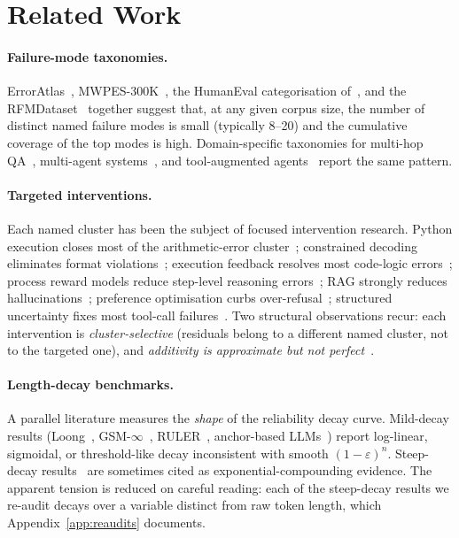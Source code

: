 \documentclass{article}
\theoremstyle{taeplain}
\theoremstyle{taedefn}
\begin{document}
\section{Related Work}
\label{sec:related}

\paragraph{Failure-mode taxonomies.}
ErrorAtlas~\citep{ashurytahan2026erroratlas}, MWPES-300K~\citep{sun2025mwpes}, the HumanEval categorisation of~\citet{wen2024fixing}, and the RFMDataset~\citep{guo2025rfmdataset} together suggest that, at any given corpus size, the number of distinct named failure modes is small (typically 8--20) and the cumulative coverage of the top modes is high. Domain-specific taxonomies for multi-hop QA~\citep{zhang2026weakestlink}, multi-agent systems~\citep{cemri2025mast}, and tool-augmented agents~\citep{yao2024taubench} report the same pattern.

\paragraph{Targeted interventions.}
Each named cluster has been the subject of focused intervention research. Python execution closes most of the arithmetic-error cluster~\citep{gao2022pal,chen2022pot,gou2024tora}; constrained decoding eliminates format violations~\citep{suresh2025dingo,wang2025slot,dong2024xgrammar}; execution feedback resolves most code-logic errors~\citep{shinn2023reflexion,huang2023agentcoder}; process reward models reduce step-level reasoning errors~\citep{wangp2024mathshepherd,lightman2024verify}; RAG strongly reduces hallucinations~\citep{wood2024acurai}; preference optimisation curbs over-refusal~\citep{karaman2024porover}; structured uncertainty fixes most tool-call failures~\citep{suri2025clarification}. Two structural observations recur: each intervention is \emph{cluster-selective} (residuals belong to a different named cluster, not to the targeted one), and \emph{additivity is approximate but not perfect}~\citep{patel2026sixsigma,le2026interaction}.

\paragraph{Length-decay benchmarks.}
A parallel literature measures the \emph{shape} of the reliability decay curve. Mild-decay results (Loong~\citep{wangm2024loong}, GSM-$\infty$~\citep{zhou2025gsminfinite}, RULER~\citep{hsieh2024ruler}, anchor-based LLMs~\citep{pang2024anchor}) report log-linear, sigmoidal, or threshold-like decay inconsistent with smooth $(1-\varepsilon)^n$. Steep-decay results~\citep{dziri2023faith,kuratov2024babilong,kwa2025horizon,wan2026fano} are sometimes cited as exponential-compounding evidence. The apparent tension is reduced on careful reading: each of the steep-decay results we re-audit decays over a variable distinct from raw token length, which Appendix~\ref{app:reaudits} documents.
\end{document}
